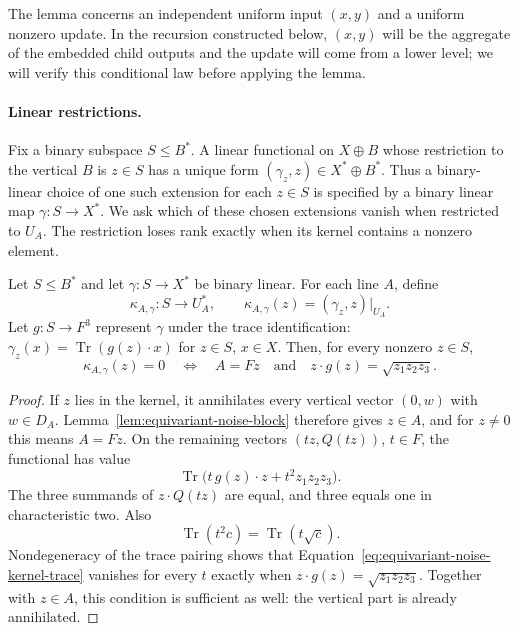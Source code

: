 The lemma concerns an independent uniform input $(x,y)$ and a uniform
nonzero update.  In the recursion constructed below, $(x,y)$ will be the
aggregate of the embedded child outputs and the update will come from a
lower level; we will verify this conditional law before applying the
lemma.

\paragraph{Linear restrictions.}
Fix a binary subspace $S\le B^*$.  A linear functional on $X\oplus B$
whose restriction to the vertical $B$ is $z\in S$ has a unique form
$(\gamma_z,z)\in X^*\oplus B^*$.  Thus a binary-linear choice of one such
extension for each $z\in S$ is specified by a binary linear map
$\gamma:S\to X^*$.  We ask which of these chosen extensions vanish when
restricted to $U_A$.  The restriction loses rank exactly when its kernel
contains a nonzero element.

\begin{lemma}\label{lem:equivariant-noise-block-kernel}
Let $S\le B^*$ and let $\gamma:S\to X^*$ be binary linear.  For each line
$A$, define
\[
 \kappa_{A,\gamma}:S\longrightarrow U_A^*,
 \qquad \kappa_{A,\gamma}(z)=(\gamma_z,z)|_{U_A}.
\]
Let $g:S\to F^3$ represent $\gamma$ under the trace identification:
$\gamma_z(x)=\operatorname{Tr}(g(z)\cdot x)$ for $z\in S$, $x\in X$.
Then, for every nonzero $z\in S$,
\[
 \kappa_{A,\gamma}(z)=0
 \quad\Longleftrightarrow\quad
 A=Fz
 \quad\text{and}\quad
 z\cdot g(z)=\sqrt{z_1z_2z_3}.
\]
\end{lemma}

\begin{proof}
If $z$ lies in the kernel, it annihilates every vertical vector
$(0,w)$ with $w\in D_A$.  Lemma~\ref{lem:equivariant-noise-block} therefore gives
$z\in A$, and for $z\ne0$ this means $A=Fz$.  On the remaining vectors
$(tz,Q(tz))$, $t\in F$, the functional has value
\begin{equation}\label{eq:equivariant-noise-kernel-trace}
 \operatorname{Tr}\bigl(t\,g(z)\cdot z+t^2z_1z_2z_3\bigr).
\end{equation}
The three summands of $z\cdot Q(tz)$ are equal, and three equals one in
characteristic two.  Also
\[
 \operatorname{Tr}(t^2c)=\operatorname{Tr}(t\sqrt c).
\]
Nondegeneracy of the trace pairing shows that
Equation~\eqref{eq:equivariant-noise-kernel-trace} vanishes for every $t$ exactly when
$z\cdot g(z)=\sqrt{z_1z_2z_3}$.  Together with $z\in A$, this condition
is sufficient as well: the vertical part is already annihilated.
\end{proof}


